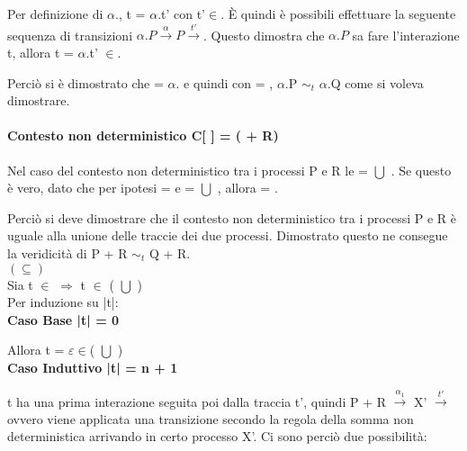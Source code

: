Per definizione di $\alpha$., t = $\alpha$.t' con t'$\in$. È quindi è possibili effettuare la seguente sequenza di transizioni $\alpha.P \overset{\alpha}\rightarrow P\overset{t'}\rightarrow $. Questo dimostra che $\alpha.P$ sa fare l'interazione t, allora t = $\alpha$.t' $\in$.

Perciò si è dimostrato che  = $\alpha$. e quindi con  = , $\alpha$.P $\sim_{t}$ $\alpha$.Q come si voleva dimostrare.
\\

\paragraph{Contesto non deterministico  C[ ] = (\hspace{0.3cm} + R)} \mbox{}

Nel caso del contesto non deterministico tra i processi P e R le  =  $\bigcup$ . Se questo è vero, dato che per ipotesi  =  e  =  $\bigcup$ , allora  =  .

Perciò si deve dimostrare che il contesto non deterministico tra i processi P e R è uguale alla unione delle traccie dei due processi. Dimostrato questo ne consegue la veridicità di P + R $\sim_{t}$ Q + R.\\

$(\subseteq)$ \\

Sia t $\in$   $\Rightarrow$  t $\in$ ( $\bigcup$ )\\
Per induzione su |t|:
\\

\textbf{Caso Base |t| = 0}

Allora t = $\varepsilon \in$( $\bigcup$ )
\\

\textbf{Caso Induttivo |t| = n + 1}

t ha una prima interazione seguita poi dalla traccia t', quindi P + R $ \overset{\alpha_{1}}\rightarrow $ X' $\overset{t'}\rightarrow$ ovvero viene applicata una transizione secondo la regola della somma non deterministica arrivando in certo processo X'. Ci sono perciò due possibilità:


